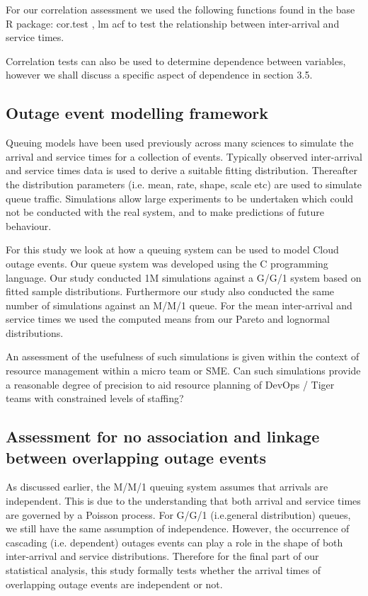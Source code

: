 \documentclass[5p]{elsarticle}
\begin{document}
For our correlation assessment we used the following functions found in the base R package: cor.test \cite{PearSpearR}, lm \cite{lmR} acf \cite{acfR} to test the relationship between inter-arrival and service times.

Correlation tests can also be used to determine dependence between variables, however we shall discuss a specific aspect of dependence in section 3.5. 

\subsection{Outage event modelling framework}

Queuing models have been used previously across many sciences to simulate the arrival and service times for a collection of events. Typically observed inter-arrival and service times data is used to derive a suitable fitting distribution. Thereafter the distribution parameters (i.e. mean, rate, shape, scale etc) are used to simulate queue traffic. Simulations allow large experiments to be undertaken which could not be conducted with the real system, and to make predictions of future behaviour.

For this study we look at how a queuing system can be used to model Cloud outage events. Our queue system was developed using the C programming language. Our study conducted 1M simulations against a G/G/1 system based on fitted sample distributions. Furthermore our study also conducted the same number of simulations against an M/M/1 queue. For the mean inter-arrival and service times we used the computed means from our Pareto and lognormal distributions.

An assessment of the usefulness of such simulations is given within the context of resource management within a micro team or SME. Can such simulations provide a reasonable degree of precision to aid resource planning of DevOps / Tiger teams with constrained levels of staffing?

\subsection{Assessment for no association and linkage between overlapping outage events}

As discussed earlier, the M/M/1 queuing system assumes that arrivals are independent. This is due to the understanding that both arrival and service times are governed by a Poisson process. For G/G/1 (i.e.general distribution) queues, we still have the same assumption of independence. However, the occurrence of cascading (i.e. dependent) outages events can play a role in the shape of both inter-arrival and service distributions. Therefore for the final part of our statistical analysis, this study formally tests whether the arrival times of overlapping outage events are independent or not. 
\end{document}
